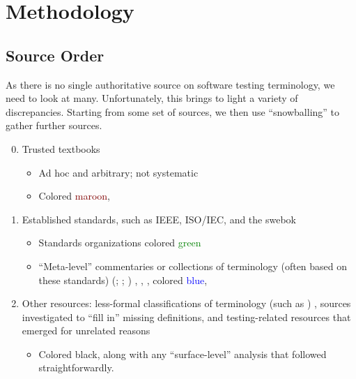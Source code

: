 \section{Methodology}
\label{method}

\subsection{Source Order}
\label{source-order}
As there is no single authoritative source on software testing terminology,
we need to look at many. Unfortunately, this brings to light a variety of
discrepancies. Starting from some set of sources, we then use
``snowballing'' %
to gather further sources.

\begin{enumerate}
      \setcounter{enumi}{-1}
      \item Trusted textbooks
            \citep{Patton2006, PetersAndPedrycz2000, vanVliet2000}
            \begin{itemize}
                  \item Ad hoc and arbitrary; not systematic
                  \item Colored \textcolor{Maroon}{maroon},
            \end{itemize}
      \item Established standards, such as IEEE, ISO/IEC, and the \acf{swebok}
            \begin{itemize}
                  \item Standards organizations \citep{IEEE2022, IEEE2017,
                              IEEE2013, ISO_IEC2023b, IEEE2012, ISO_IEC2023a,
                              IEEE2021, ISO_IEC2018, ISO2021, ISO2015}
                        colored \textcolor{green}{green}
                  \item ``Meta-level'' commentaries or collections of
                        terminology (often based on these standards)
                        \ifnotpaper
                              (\citealp{SWEBOK2024, SWEBOK2014};
                              \citealpISTQB{}; \citealp{Firesmith2015})
                        \else
                              \cite{ISTQB}, \cite{Firesmith2015},
                              \cite{SWEBOK2024}, \cite{SWEBOK2014}
                        \fi colored \textcolor{blue}{blue},
            \end{itemize}
      \item Other resources: less-formal classifications of terminology
            \ifnotpaper
                  \citep[e.g.,][]{KuļešovsEtAl2013}%
            \else
                  (such as \citep{KuļešovsEtAl2013})%
            \fi%
            , sources investigated to
            ``fill in'' missing definitions,
            and testing-related resources that emerged for unrelated reasons
            \begin{itemize}
                  \item Colored black, along with any ``surface-level''
                        analysis that followed straightforwardly.
            \end{itemize}
\end{enumerate}

